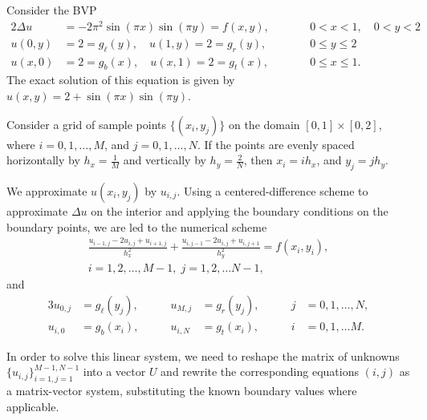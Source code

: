 \documentclass{homework}
\begin{document}
	\question
	Consider the BVP
	\begin{alignat*}{2}
		\Delta u &= -2\pi^2\sin(\pi x)\sin(\pi y) = f(x,y), &\qquad &0<x<1, \quad 0<y<2 \\
		u(0,y) &= 2 = g_\ell(y), \quad u(1, y) = 2 = g_r(y), & \qquad &0 \le y \le 2\\
		u(x,0) &= 2 = g_b(x), \quad u(x, 1) = 2 = g_t(x), & \qquad &0 \le x \le 1. 
	\end{alignat*}
	The exact solution of this equation is given by $u(x,y) = 2 +\sin(\pi x)\sin(\pi y)$.
	
	\begin{alphaparts}
		\questionpart Consider a grid of sample points $\{(x_i, y_j)\}$ on the domain $[0,1]\times[0,2]$, where $i = 0,1,\dots, M$, and $j = 0,1,\dots, N$. If the points are evenly spaced horizontally by $h_x = \frac{1}{M}$ and vertically by $h_y = \frac{2}{N}$, then $x_i = ih_x$, and $y_j = jh_y$.
		
		We approximate $u(x_i,y_j)$ by $u_{i,j}$. Using a centered-difference scheme to approximate $\Delta u$ on the interior and applying the boundary conditions on the boundary points, we are led to the numerical scheme
		\begin{equation*}
			\tag{$i,j$}
			\begin{split}
				\frac{u_{i-1,j} - 2u_{i,j} + u_{i+1,j}}{h_x^2} + \frac{u_{i,j-1} -2 u_{i,j} + u_{i,j+1}}{h_y^2} = f(x_i, y_i),\\  i=1,2,\dots, M-1,\; j=1,2,\dots N-1,
			\end{split}
		\end{equation*}
		and
		\begin{alignat*}{3}
			u_{0,j} &= g_\ell(y_j),& \qquad u_{M,j} &= g_r(y_j),& \qquad j&=0,1,\dots,N,\\
			u_{i,0} &= g_b(x_i), & \qquad u_{i,N} &= g_t(x_i),& \qquad i&=0,1,\dots M.
		\end{alignat*}
		
		In order to solve this linear system, we need to reshape the matrix of unknowns $\{u_{i,j}\}_{i=1,j=1}^{M-1,N-1}$ into a vector $U$ and rewrite the corresponding equations $(i,j)$ as a matrix-vector system, substituting the known boundary values where applicable.
		

\end{alphaparts}
\end{document}
